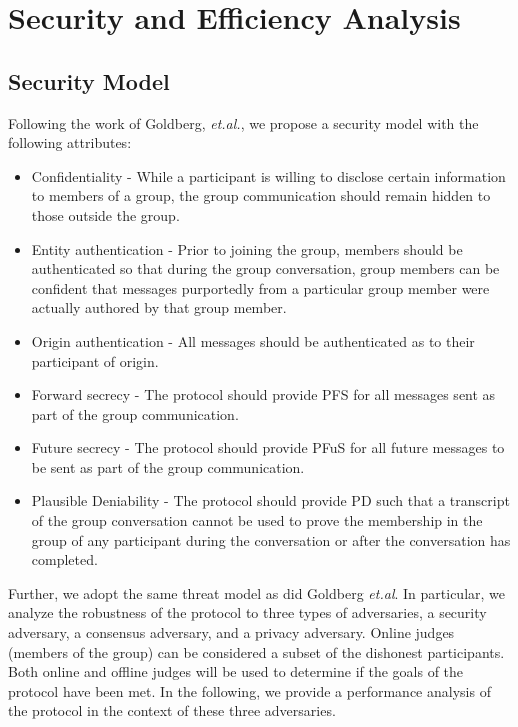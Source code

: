 \documentclass[%
preprint,
amsmath,amssymb,
aps,
prb,
floatfix,
]{revtex4-1}
\begin{document}
\section{\label{sec:analysis}Security and Efficiency Analysis}

\subsection{\label{sec:securitymodel}Security Model}
Following the work of Goldberg, \textit{et.al.}\cite{ref:goldberg}, we propose a
security model with the following attributes:
\begin{itemize}
\item Confidentiality - While a participant is willing to disclose certain
information to members of a group, the group communication should remain hidden
to those outside the group.
\item Entity authentication - Prior to joining the group, members should be
authenticated so that during the group conversation, group members can be
confident that messages purportedly from a particular group member were
actually authored by that group member.
\item Origin authentication - All messages should be authenticated as to their
participant of origin.
\item Forward secrecy - The protocol should provide PFS for all messages sent as
part of the group communication.
\item Future secrecy - The protocol should provide PFuS for all future messages
to be sent as part of the group communication.
\item Plausible Deniability - The protocol should provide PD such that a
transcript of the group conversation cannot be used to prove the membership in
the group of any participant during the conversation or after the conversation has completed.
\end{itemize}

Further, we adopt the same threat model as did Goldberg
\textit{et.al}\cite{ref:goldberg}. In particular, we analyze the robustness of
the protocol to three types of adversaries, a security adversary, a consensus
adversary, and a privacy adversary.
Online judges (members of the group) can
be considered a subset of the dishonest participants. Both online and offline
judges will be used to determine if the goals of the protocol have been met.
In the following, we provide a performance analysis of the protocol in the
context of these three adversaries.
\end{document}
